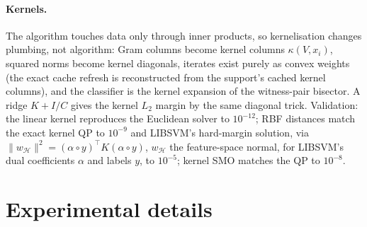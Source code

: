 \documentclass{opt2026}   %
\newcommand{\norm}[1]{\lVert #1 \rVert}
\begin{document}
\paragraph{Kernels.} The algorithm touches data only through inner
products, so kernelisation changes plumbing, not algorithm: Gram columns
become kernel columns $\kappa(V,x_i)$, squared norms become kernel
diagonals,
iterates exist purely as convex weights (the exact cache refresh is
reconstructed from the support's cached kernel columns), and the
classifier is the kernel expansion of the witness-pair bisector. A ridge
$K+I/C$ gives the kernel $L_2$ margin by the same diagonal trick.
Validation: the linear kernel reproduces the Euclidean solver to
$10^{-12}$; RBF distances match the exact kernel QP to $10^{-9}$ and
LIBSVM's hard-margin solution, via
$\norm{w_{\mathcal H}}^2=(\alpha\circ y)^\top K(\alpha\circ y)$, $w_{\mathcal H}$ the
feature-space normal, for
LIBSVM's dual coefficients $\alpha$ and labels $y$, to $10^{-5}$;
kernel SMO matches the QP to $10^{-8}$.

\section{Experimental details}\label{app:details}
\end{document}
